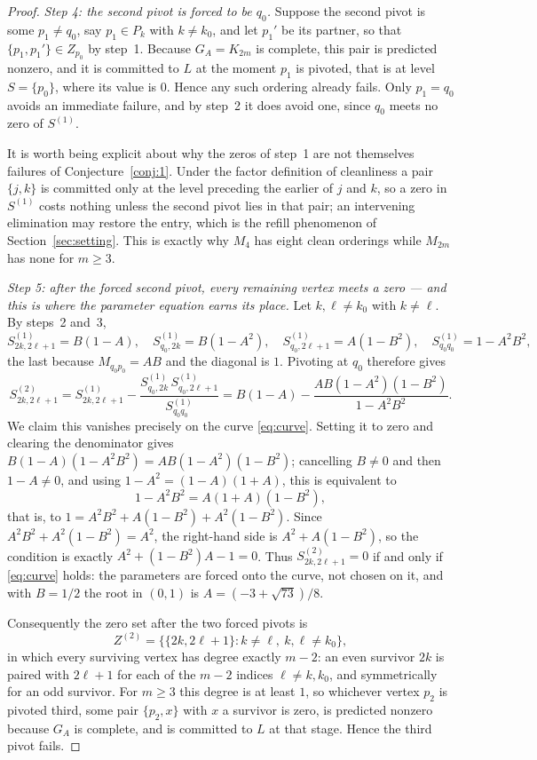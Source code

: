 \documentclass[11pt]{article}
\theoremstyle{plain}
\theoremstyle{definition}
\begin{document}
\begin{aiblock}
\begin{proof}
\emph{Step 4: the second pivot is forced to be $q_0$.} Suppose the second pivot is some
$p_1\neq q_0$, say $p_1\in P_k$ with $k\neq k_0$, and let $p_1'$ be its partner, so that
$\{p_1,p_1'\}\in Z_{p_0}$ by step~1. Because $G_A=K_{2m}$ is complete, this pair is predicted nonzero,
and it is committed to $L$ at the moment $p_1$ is pivoted, that is at level $S=\{p_0\}$, where its
value is $0$. Hence any such ordering already fails. Only $p_1=q_0$ avoids an immediate failure, and
by step~2 it does avoid one, since $q_0$ meets no zero of $S^{(1)}$.

It is worth being explicit about why the zeros of step~1 are not themselves failures of
Conjecture~\ref{conj:1}. Under the factor definition of cleanliness a pair $\{j,k\}$ is committed only
at the level preceding the earlier of $j$ and $k$, so a zero in $S^{(1)}$ costs nothing unless the
second pivot lies in that pair; an intervening elimination may restore the entry, which is the refill
phenomenon of Section~\ref{sec:setting}. This is exactly why $M_4$ has eight clean orderings while
$M_{2m}$ has none for $m\ge3$.

\emph{Step 5: after the forced second pivot, every remaining vertex meets a zero --- and this is
where the parameter equation earns its place.} Let $k,\ell\neq k_0$ with $k\neq\ell$. By steps~2
and~3,
\[
S^{(1)}_{2k,2\ell+1}=B(1-A),\quad
S^{(1)}_{q_0,2k}=B(1-A^2),\quad
S^{(1)}_{q_0,2\ell+1}=A(1-B^2),\quad
S^{(1)}_{q_0q_0}=1-A^2B^2 ,
\]
the last because $M_{q_0p_0}=AB$ and the diagonal is $1$. Pivoting at $q_0$ therefore gives
\[
S^{(2)}_{2k,2\ell+1}
 =S^{(1)}_{2k,2\ell+1}-\frac{S^{(1)}_{q_0,2k}\,S^{(1)}_{q_0,2\ell+1}}{S^{(1)}_{q_0q_0}}
 =B(1-A)-\frac{AB(1-A^2)(1-B^2)}{1-A^2B^2}.
\]
We claim this vanishes precisely on the curve \eqref{eq:curve}. Setting it to zero and clearing the
denominator gives $B(1-A)(1-A^2B^2)=AB(1-A^2)(1-B^2)$; cancelling $B\neq0$ and then $1-A\neq0$, and
using $1-A^2=(1-A)(1+A)$, this is equivalent to
\[
1-A^2B^2=A(1+A)(1-B^2),
\]
that is, to $1=A^2B^2+A(1-B^2)+A^2(1-B^2)$. Since $A^2B^2+A^2(1-B^2)=A^2$, the right-hand side is
$A^2+A(1-B^2)$, so the condition is exactly $A^2+(1-B^2)A-1=0$. Thus $S^{(2)}_{2k,2\ell+1}=0$ if and
only if \eqref{eq:curve} holds: the parameters are forced onto the curve, not chosen on it, and with
$B=1/2$ the root in $(0,1)$ is $A=(-3+\sqrt{73})/8$.

Consequently the zero set after the two forced pivots is
\[
Z^{(2)}=\bigl\{\{2k,2\ell+1\}: k\neq\ell,\ k,\ell\neq k_0\bigr\},
\]
in which every surviving vertex has degree exactly $m-2$: an even survivor $2k$ is paired with
$2\ell+1$ for each of the $m-2$ indices $\ell\neq k,k_0$, and symmetrically for an odd survivor. For
$m\ge3$ this degree is at least $1$, so whichever vertex $p_2$ is pivoted third, some pair
$\{p_2,x\}$ with $x$ a survivor is zero, is predicted nonzero because $G_A$ is complete, and is
committed to $L$ at that stage. Hence the third pivot fails.


\end{proof}
\end{aiblock}
\end{document}
